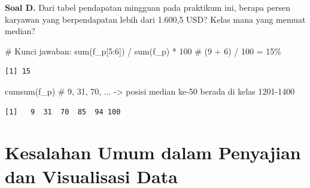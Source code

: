 \documentclass[
  indonesian,
  letterpaper,
]{book}
\newenvironment{Shaded}{\begin{snugshade}}{\end{snugshade}}
\newcommand{\CommentTok}[1]{\textcolor[rgb]{0.37,0.37,0.37}{#1}}
\newcommand{\DecValTok}[1]{\textcolor[rgb]{0.68,0.00,0.00}{#1}}
\newcommand{\FunctionTok}[1]{\textcolor[rgb]{0.28,0.35,0.67}{#1}}
\newcommand{\NormalTok}[1]{\textcolor[rgb]{0.00,0.23,0.31}{#1}}
\newcommand{\SpecialCharTok}[1]{\textcolor[rgb]{0.37,0.37,0.37}{#1}}
\begin{document}
\textbf{Soal D.} Dari tabel pendapatan mingguan pada praktikum ini,
berapa persen karyawan yang berpendapatan lebih dari 1.600,5 USD? Kelas
mana yang memuat median?

\begin{Shaded}
\begin{Highlighting}[]
\CommentTok{\# Kunci jawaban:}
\FunctionTok{sum}\NormalTok{(f\_p[}\DecValTok{5}\SpecialCharTok{:}\DecValTok{6}\NormalTok{]) }\SpecialCharTok{/} \FunctionTok{sum}\NormalTok{(f\_p) }\SpecialCharTok{*} \DecValTok{100} \CommentTok{\# (9 + 6) / 100 = 15\%}
\end{Highlighting}
\end{Shaded}

\begin{verbatim}
[1] 15
\end{verbatim}

\begin{Shaded}
\begin{Highlighting}[]
\FunctionTok{cumsum}\NormalTok{(f\_p) }\CommentTok{\# 9, 31, 70, ... {-}\textgreater{} posisi median ke{-}50 berada di kelas 1201{-}1400}
\end{Highlighting}
\end{Shaded}

\begin{verbatim}
[1]   9  31  70  85  94 100
\end{verbatim}

\section{Kesalahan Umum dalam Penyajian dan Visualisasi
Data}\label{kesalahan-umum-dalam-penyajian-dan-visualisasi-data}
\end{document}
